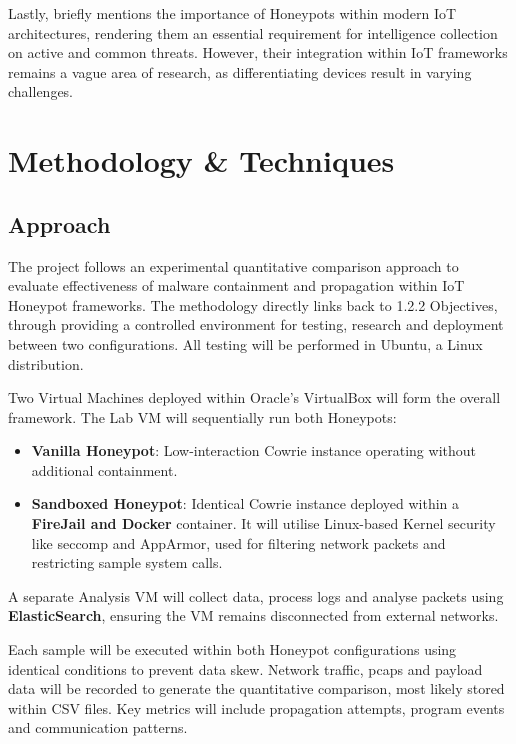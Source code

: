 \documentclass[a4paper,12pt,oneside]{book}			%
\begin{document}
Lastly, \textit{\citep{crowdstrike-honeypot}} briefly mentions the importance of Honeypots within modern IoT architectures, rendering them an essential requirement for intelligence collection on active and common threats. However, their integration within IoT frameworks remains a vague area of research, as differentiating devices result in varying challenges.

\chapter{Methodology \&{} Techniques}\label{ch:methods}
\section{Approach}\label{sec:approach}

The project follows an experimental quantitative comparison approach to evaluate effectiveness of malware containment and propagation within IoT Honeypot frameworks. The methodology directly links back to 1.2.2 Objectives, through providing a controlled environment for testing, research and deployment between two configurations. All testing will be performed in Ubuntu, a Linux distribution.

Two Virtual Machines deployed within Oracle’s VirtualBox will form the overall framework. The Lab VM will sequentially run both Honeypots:
\begin{itemize}
	\item\textbf{Vanilla Honeypot}: Low-interaction Cowrie instance operating without additional containment.
	\item\textbf{Sandboxed Honeypot}: Identical Cowrie instance deployed within a \textbf{FireJail and Docker} container. It will utilise Linux-based Kernel security like seccomp and AppArmor, used for filtering network packets and restricting sample system calls.
\end{itemize}

A separate Analysis VM will collect data, process logs and analyse packets using \textbf{ElasticSearch}, ensuring the VM remains disconnected from external networks.

Each sample will be executed within both Honeypot configurations using identical conditions to prevent data skew. Network traffic, pcaps and payload data will be recorded to generate the quantitative comparison, most likely stored within CSV files. Key metrics will include propagation attempts, program events and communication patterns.
\end{document}
